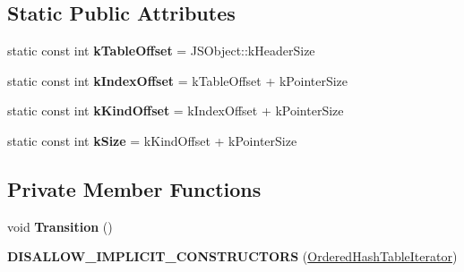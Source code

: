 \subsection*{Static Public Attributes}
\begin{DoxyCompactItemize}
\item 
static const int {\bfseries k\+Table\+Offset} = J\+S\+Object\+::k\+Header\+Size\hypertarget{classv8_1_1internal_1_1_ordered_hash_table_iterator_a93f8a314fe2a560033dcc55b04f167ed}{}\label{classv8_1_1internal_1_1_ordered_hash_table_iterator_a93f8a314fe2a560033dcc55b04f167ed}

\item 
static const int {\bfseries k\+Index\+Offset} = k\+Table\+Offset + k\+Pointer\+Size\hypertarget{classv8_1_1internal_1_1_ordered_hash_table_iterator_a04975cd44a6c4d130f1e8b52b661a00c}{}\label{classv8_1_1internal_1_1_ordered_hash_table_iterator_a04975cd44a6c4d130f1e8b52b661a00c}

\item 
static const int {\bfseries k\+Kind\+Offset} = k\+Index\+Offset + k\+Pointer\+Size\hypertarget{classv8_1_1internal_1_1_ordered_hash_table_iterator_a7bc54a132d30bb774cf8f44d3fbfd089}{}\label{classv8_1_1internal_1_1_ordered_hash_table_iterator_a7bc54a132d30bb774cf8f44d3fbfd089}

\item 
static const int {\bfseries k\+Size} = k\+Kind\+Offset + k\+Pointer\+Size\hypertarget{classv8_1_1internal_1_1_ordered_hash_table_iterator_a0408c822f18c4fe33272d6f2a57f465a}{}\label{classv8_1_1internal_1_1_ordered_hash_table_iterator_a0408c822f18c4fe33272d6f2a57f465a}

\end{DoxyCompactItemize}
\subsection*{Private Member Functions}
\begin{DoxyCompactItemize}
\item 
void {\bfseries Transition} ()\hypertarget{classv8_1_1internal_1_1_ordered_hash_table_iterator_ad9b58d795d539edc270e8e0693900f2a}{}\label{classv8_1_1internal_1_1_ordered_hash_table_iterator_ad9b58d795d539edc270e8e0693900f2a}

\item 
{\bfseries D\+I\+S\+A\+L\+L\+O\+W\+\_\+\+I\+M\+P\+L\+I\+C\+I\+T\+\_\+\+C\+O\+N\+S\+T\+R\+U\+C\+T\+O\+RS} (\hyperlink{classv8_1_1internal_1_1_ordered_hash_table_iterator}{Ordered\+Hash\+Table\+Iterator})\hypertarget{classv8_1_1internal_1_1_ordered_hash_table_iterator_ae5052c012c84686d173b7eee11f7d4c3}{}\label{classv8_1_1internal_1_1_ordered_hash_table_iterator_ae5052c012c84686d173b7eee11f7d4c3}

\end{DoxyCompactItemize}
